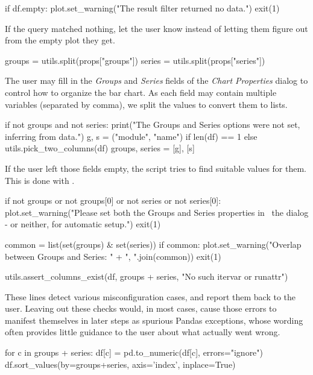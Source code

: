 \begin{python}
if df.empty:
    plot.set_warning("The result filter returned no data.")
    exit(1)
\end{python}

If the query matched nothing, let the user know instead of letting them figure
out from the empty plot they get.

\begin{python}
groups = utils.split(props["groups"])
series = utils.split(props["series"])
\end{python}

The user may fill in the \textit{Groups} and \textit{Series} fields of the
\textit{Chart Properties} dialog to control how to organize the bar chart. As
each field may contain multiple variables (separated by comma), we split the
values to convert them to lists.

\begin{python}
if not groups and not series:
    print("The Groups and Series options were not set, inferring from data.")
    g, s = ("module", "name") if len(df) == 1 else utils.pick_two_columns(df)
    groups, series = [g], [s]
\end{python}

\raggedright
If the user left those fields empty, the script tries to find suitable values
for them. This is done with .

\begin{python}
if not groups or not groups[0] or not series or not series[0]:
    plot.set_warning("Please set both the Groups and Series properties in \
                      the dialog - or neither, for automatic setup.")
    exit(1)

common = list(set(groups) & set(series))
if common:
    plot.set_warning("Overlap between Groups and Series: " + ", ".join(common))
    exit(1)

utils.assert_columns_exist(df, groups + series, "No such itervar or runattr")
\end{python}

These lines detect various misconfiguration cases, and report them back to the
user. Leaving out these checks would, in most cases, cause those errors to
manifest themselves in later steps as spurious Pandas exceptions, whose wording
often provides little guidance to the user about what actually went wrong.

\begin{python}
for c in groups + series:
    df[c] = pd.to_numeric(df[c], errors="ignore")
df.sort_values(by=groups+series, axis='index', inplace=True)
\end{python}

